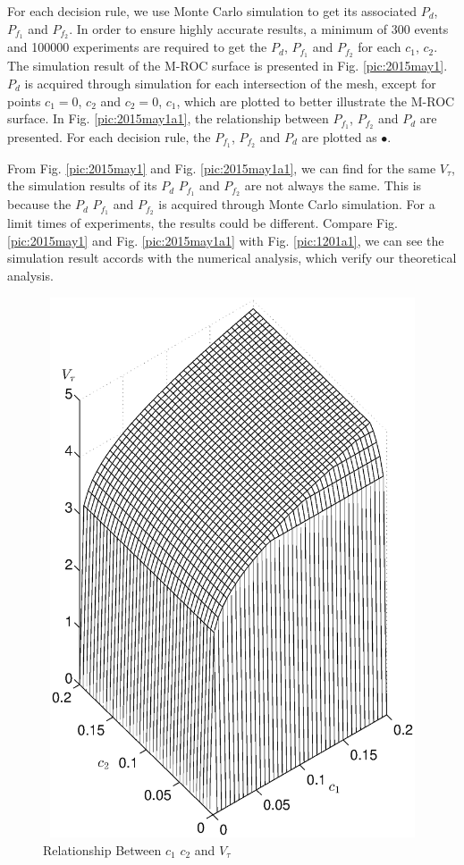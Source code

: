 For each decision rule, we use Monte Carlo simulation to get its associated $P_d$, $P_{f_1}$ and $P_{f_2}$.   
In order to ensure highly accurate results, a minimum of 300 events and 100000 experiments are required to get the $P_d$, $P_{f_1}$ and $P_{f_2}$ for each $c_1$, $c_2$.   The simulation result of the M-ROC surface is presented in Fig. \ref{pic:2015may1}. 
 $P_d$ is acquired through simulation for each intersection of the mesh, except for points $c_1 = 0$, $c_2$ and $c_2 = 0$, $c_1$, 
which are plotted to better illustrate the M-ROC surface. 
In Fig. \ref{pic:2015may1a1}, the relationship between $P_{f_1}$, $P_{f_2}$ and $P_d$ are presented. For each decision rule, the $P_{f_1}$, $P_{f_2}$ and $P_d$ are plotted as $\bullet$.

From Fig. \ref{pic:2015may1} and Fig. \ref{pic:2015may1a1}, we can find for the same $V_\tau$, the simulation results of its $P_d$ $P_{f_1}$ and $P_{f_2}$  are not always the same. This is because the $P_d$ $P_{f_1}$ and $P_{f_2}$ is acquired through Monte Carlo simulation. For a limit times of experiments, the results could be different. Compare Fig. \ref{pic:2015may1} and  Fig. \ref{pic:2015may1a1} with Fig. \ref{pic:1201a1}, we can see the simulation result accords with the numerical analysis, which verify our theoretical analysis.


\begin{figure}[!t]
\centering
\includegraphics[width=12cm, height=16cm]{4/c1c2t.eps}
\caption{Relationship Between $c_1$ $c_2$ and $V_\tau$}
\label{pic:2015may1a0}
\end{figure}



